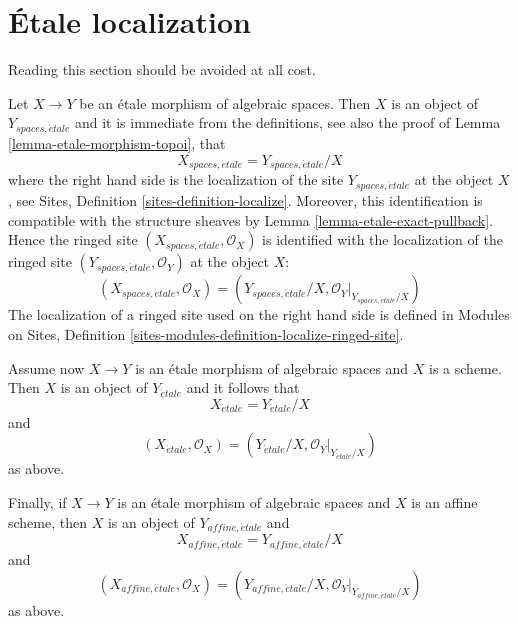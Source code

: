 \section{\'Etale localization}
\label{section-localize}

\noindent
Reading this section should be avoided at all cost.

\medskip\noindent
Let $X \to Y$ be an \'etale morphism of algebraic spaces.
Then $X$ is an object of $Y_{spaces, \acute{e}tale}$ and it is
immediate from the definitions, see also the proof of
Lemma \ref{lemma-etale-morphism-topoi},
that
\begin{equation}
\label{equation-localize}
X_{spaces, \acute{e}tale} = Y_{spaces, \acute{e}tale}/X
\end{equation}
where the right hand side is the localization of the site
$Y_{spaces, \acute{e}tale}$ at the object $X$, see
Sites, Definition \ref{sites-definition-localize}.
Moreover, this identification is compatible with the structure sheaves by
Lemma \ref{lemma-etale-exact-pullback}.
Hence the ringed site $(X_{spaces, \acute{e}tale}, \mathcal{O}_X)$
is identified with the localization of the ringed site
$(Y_{spaces, \acute{e}tale}, \mathcal{O}_Y)$ at the object $X$:
\begin{equation}
\label{equation-localize-ringed}
(X_{spaces, \acute{e}tale}, \mathcal{O}_X) =
(Y_{spaces, \acute{e}tale}/X, \mathcal{O}_Y|_{Y_{spaces, \acute{e}tale}/X})
\end{equation}
The localization of a ringed site used on the right hand side is defined in
Modules on Sites,
Definition \ref{sites-modules-definition-localize-ringed-site}.

\medskip\noindent
Assume now $X \to Y$ is an \'etale morphism of algebraic spaces and $X$ is
a scheme. Then $X$ is an object of $Y_{\acute{e}tale}$ and it follows that
\begin{equation}
\label{equation-localize-at-scheme}
X_{\acute{e}tale} = Y_{\acute{e}tale}/X
\end{equation}
and
\begin{equation}
\label{equation-localize-at-scheme-ringed}
(X_{\acute{e}tale}, \mathcal{O}_X) =
(Y_{\acute{e}tale}/X, \mathcal{O}_Y|_{Y_{\acute{e}tale}/X})
\end{equation}
as above.

\medskip\noindent
Finally, if $X \to Y$ is an \'etale morphism of algebraic spaces and $X$ is
an affine scheme, then $X$ is an object of $Y_{affine, \acute{e}tale}$ and
\begin{equation}
\label{equation-localize-at-affine}
X_{affine, \acute{e}tale} = Y_{affine, \acute{e}tale}/X
\end{equation}
and
\begin{equation}
\label{equation-localize-at-affine-ringed}
(X_{affine, \acute{e}tale}, \mathcal{O}_X) =
(Y_{affine, \acute{e}tale}/X, \mathcal{O}_Y|_{Y_{affine, \acute{e}tale}/X})
\end{equation}
as above.


